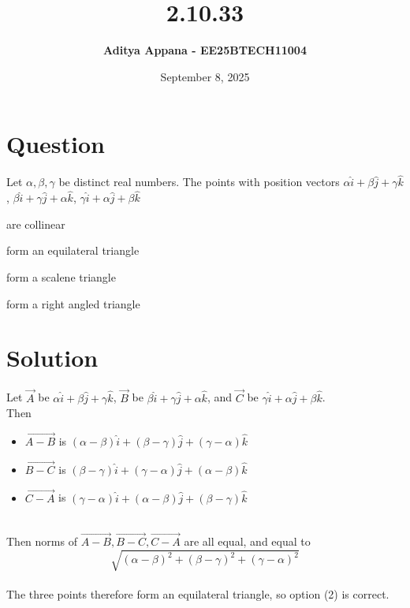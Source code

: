 \documentclass[12pt]{article}
\title{\textbf{2.10.33}}
\author{\textbf{Aditya Appana - EE25BTECH11004 }}
\date{September 8, 2025}
\begin{document}
\maketitle

\section*{Question}

Let $\alpha , \beta, \gamma$ be distinct real numbers. The points with position vectors $\alpha\hat{i} + \beta\hat{j} + \gamma\hat{k}$, $\beta\hat{i} +\gamma\hat{j} + \alpha\hat{k}$, $\gamma\hat{i} + \alpha\hat{j} + \beta\hat{k}$

\begin{enumerate}\begin{multicols}{2}
    \item are collinear
    \item form an equilateral triangle
    \item form a scalene triangle
    \item form a right angled triangle
    \end{multicols}
\end{enumerate}

\section*{Solution}

Let $\vec{A}$ be $\alpha\hat{i} + \beta\hat{j} + \gamma\hat{k}$, $\vec{B}$ be $\beta\hat{i} +\gamma\hat{j} + \alpha\hat{k}$, and $\vec{C}$ be $\gamma\hat{i} + \alpha\hat{j} + \beta\hat{k}$. \\

Then 
\begin{itemize}
    \item $\vec{A-B}$ is $(\alpha - \beta)\hat{i} + (\beta - \gamma)\hat{j} + (\gamma - \alpha)\hat{k}$
    \item $\vec{B-C}$ is $(\beta - \gamma)\hat{i} + (\gamma - \alpha)\hat{j} + (\alpha - \beta)\hat{k}$
    \item $\vec{C-A}$ is $(\gamma - \alpha)\hat{i} + (\alpha - \beta)\hat{j} + (\beta - \gamma)\hat{k}$
    
\end{itemize}\\

Then norms of $\vec{A-B}, \vec{B-C}, \vec{C-A}$ are all equal, and equal to 
$$\sqrt{(\alpha - \beta)^2  + (\beta - \gamma)^2 + (\gamma - \alpha)^2}$$\\

The three points therefore form an equilateral triangle, so option (2) is correct.
\end{document}
